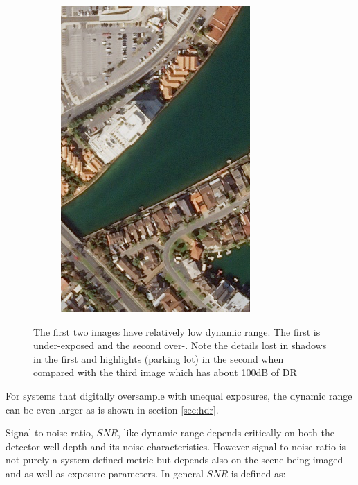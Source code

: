 \documentclass[10pt,journal]{IEEEtran}  %
\begin{document}
\begin{figure}[h!]
\begin{subfigure}{0.31\linewidth}
\includegraphics[width = \textwidth]{figures/pb_good_dr.png}
\end{subfigure}
\caption{The first two images have relatively low dynamic range.  The first is under-exposed and the second over-.  Note the details lost in shadows in the first and highlights (parking lot) in the second when compared with the third image which has about 100dB of DR}
\end{figure}

For systems that digitally oversample with unequal exposures, the dynamic range can be even larger as is shown in section \ref{sec:hdr}.

Signal-to-noise ratio, $SNR$, like dynamic range depends critically on both the detector well depth and its noise characteristics.  However signal-to-noise ratio is not purely a system-defined metric but depends also on the scene being imaged and as well as exposure parameters.  In general $SNR$ is defined as:
\end{document}
